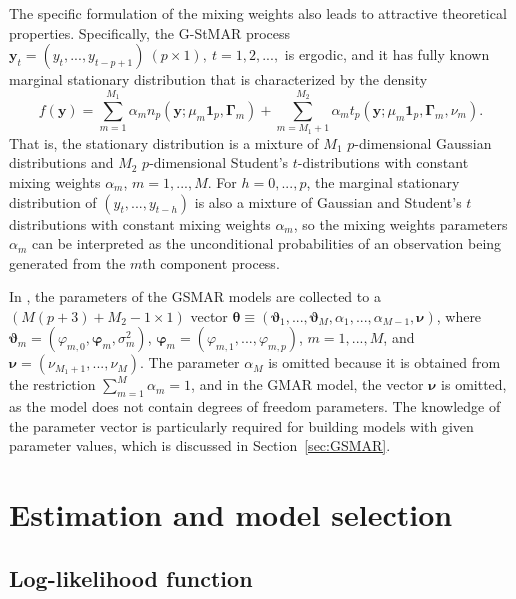 \documentclass[nojss]{jss} %
\begin{document}
The specific formulation of the mixing weights also leads to attractive theoretical properties. Specifically, the G-StMAR process $\boldsymbol{y}_{t}=(y_{t},...,y_{t-p+1}) \ (p \times 1), \ t=1,2,...,$ is ergodic, and it has fully known marginal stationary distribution that is characterized by the density \citep[][Theorem 1; see the proof of Theorem 1 for the stationary distribution of $1,...,p+1$ consecutive observations]{Virolainen:2020}
\begin{equation}\label{eq:statdist}
f(\boldsymbol{y}) = \sum_{m=1}^{M_1}\alpha_m n_p(\boldsymbol{y};\mu_m\boldsymbol{1}_p,\boldsymbol{\Gamma}_m) + \sum_{m=M_1 + 1}^{M_2}\alpha_m t_p(\boldsymbol{y};\mu_m\boldsymbol{1}_p,\boldsymbol{\Gamma}_m,\nu_m).
\end{equation}
%
That is, the stationary distribution is a mixture of $M_1$ $p$-dimensional Gaussian distributions and $M_2$ $p$-dimensional Student's $t$-distributions with constant mixing weights $\alpha_m$, $m=1,...,M$. For $h=0,...,p$, the marginal stationary distribution of $(y_t,...,y_{t-h})$ is also a mixture of Gaussian and Student's $t$ distributions with constant mixing weights $\alpha_m$, so the mixing weights parameters $\alpha_m$ can be interpreted as the unconditional probabilities of an observation being generated from the $m$th component process.

In , the parameters of the GSMAR models are collected to a $(M(p+3)+M_2-1\times 1)$ vector $\boldsymbol{\theta} \equiv (\boldsymbol{\vartheta}_1,...,\boldsymbol{\vartheta}_M,\alpha_1,...,\alpha_{M-1},\boldsymbol{\nu})$, where $\boldsymbol{\vartheta}_m=(\varphi_{m,0},\boldsymbol{\varphi}_m,\sigma^2_m)$, $\boldsymbol{\varphi}_m=(\varphi_{m,1},...,\varphi_{m,p})$, $m=1,...,M$, and $\boldsymbol{\nu}=(\nu_{M_1+1},...,\nu_M)$. The parameter $\alpha_M$ is omitted because it is obtained from the restriction $\sum_{m=1}^M\alpha_m=1$, and in the GMAR model, the vector $\boldsymbol{\nu}$ is omitted, as the model does not contain degrees of freedom parameters. The knowledge of the parameter vector is particularly required for building models with given parameter values, which is discussed in Section~\ref{sec:GSMAR}.


\section{Estimation and model selection}\label{sec:estimation}

\subsection{Log-likelihood function}\label{sec:loglik}
\end{document}
